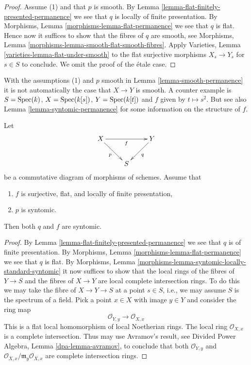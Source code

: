 \begin{proof}
Assume (1) and that $p$ is smooth. By
Lemma \ref{lemma-flat-finitely-presented-permanence}
we see that $q$ is locally of finite presentation.
By
Morphisms, Lemma \ref{morphisms-lemma-flat-permanence}
we see that $q$ is flat.
Hence now it suffices to show that the fibres of $q$ are smooth, see
Morphisms, Lemma \ref{morphisms-lemma-smooth-flat-smooth-fibres}.
Apply
Varieties, Lemma \ref{varieties-lemma-flat-under-smooth}
to the flat surjective morphisms $X_s \to Y_s$ for $s \in S$ to
conclude. We omit the proof of the \'etale case.
\end{proof}

\begin{remark}
\label{remark-smooth-permanence}
With the assumptions (1) and $p$ smooth in
Lemma \ref{lemma-smooth-permanence}
it is not automatically the case that $X \to Y$ is smooth.
A counter example is $S = \mathop{\mathrm{Spec}}(k)$, $X = \mathop{\mathrm{Spec}}(k[s])$,
$Y = \mathop{\mathrm{Spec}}(k[t])$ and $f$ given by $t \mapsto s^2$.
But see also Lemma \ref{lemma-syntomic-permanence}
for some information on the structure of $f$.
\end{remark}

\begin{lemma}
\label{lemma-syntomic-permanence}
Let
$$
\xymatrix{
X \ar[rr]_f \ar[rd]_p & &
Y \ar[dl]^q \\
& S
}
$$
be a commutative diagram of morphisms of schemes. Assume that
\begin{enumerate}
\item $f$ is surjective, flat, and locally of finite presentation,
\item $p$ is syntomic.
\end{enumerate}
Then both $q$ and $f$ are syntomic.
\end{lemma}

\begin{proof}
By Lemma \ref{lemma-flat-finitely-presented-permanence} we see that $q$
is of finite presentation. By
Morphisms, Lemma \ref{morphisms-lemma-flat-permanence}
we see that $q$ is flat.
By Morphisms, Lemma \ref{morphisms-lemma-syntomic-locally-standard-syntomic}
it now suffices to show that the local rings of the fibres of
$Y \to S$ and the fibres of $X \to Y$ are local complete intersection
rings. To do this we may take the fibre of $X \to Y \to S$ at
a point $s \in S$, i.e., we may assume $S$ is the spectrum of a
field. Pick a point $x \in X$ with image $y \in Y$ and
consider the ring map
$$
\mathcal{O}_{Y, y} \longrightarrow \mathcal{O}_{X, x}
$$
This is a flat local homomorphism of local Noetherian rings.
The local ring $\mathcal{O}_{X, x}$ is a complete intersection.
Thus may use Avramov's result, see
Divided Power Algebra, Lemma \ref{dpa-lemma-avramov},
to conclude that both $\mathcal{O}_{Y, y}$ and
$\mathcal{O}_{X, x}/\mathfrak m_y\mathcal{O}_{X, x}$ are
complete intersection rings.
\end{proof}

